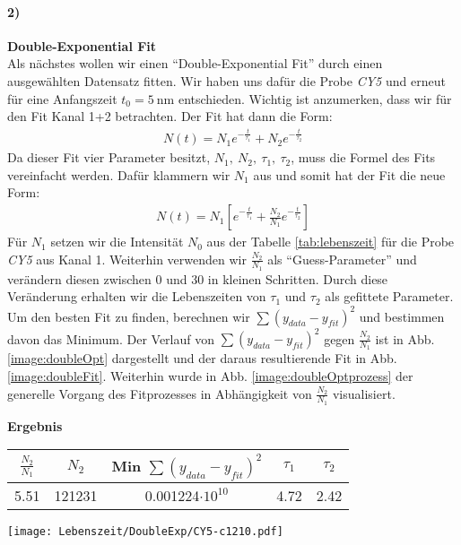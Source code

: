 \paragraph{2)}\textbf{Double-Exponential Fit}\\
Als nächstes wollen wir einen \enquote{Double-Exponential Fit} durch einen ausgewählten Datensatz fitten. Wir haben uns dafür die Probe \textit{CY5} und erneut für eine Anfangszeit $t_{0}=\SI{5}{\nano\metre}$ entschieden. Wichtig ist anzumerken, dass wir für den Fit Kanal 1+2 betrachten. Der Fit hat dann die Form:
\begin{gather}
    N(t) = N_1e^{-\frac{t}{\tau_1}} + N_2e^{-\frac{t}{\tau_2}}
\end{gather}
Da dieser Fit vier Parameter besitzt, $N_1,~N_2,~\tau_1,~\tau_2$, muss die Formel des Fits vereinfacht werden. Dafür klammern wir $N_1$ aus und somit hat der Fit die neue Form:
\begin{gather}
    N(t) = N_1\left[e^{-\frac{t}{\tau_1}} + \frac{N_2}{N_1}e^{-\frac{t}{\tau_2}}\right]
\end{gather}
Für $N_1$ setzen wir die Intensität $N_0$ aus der Tabelle \ref{tab:lebenszeit} für die Probe \textit{CY5} aus Kanal 1. Weiterhin verwenden wir $\frac{N_2}{N_1}$ als \enquote{Guess-Parameter} und verändern diesen zwischen 0 und 30 in kleinen Schritten. Durch diese Veränderung erhalten wir die Lebenszeiten von $\tau_1$ und $\tau_2$ als gefittete Parameter. Um den besten Fit zu finden, berechnen wir $\sum(y_{data}-y_{fit})^2$ und bestimmen davon das Minimum. Der Verlauf von $\sum(y_{data}-y_{fit})^2$ gegen $\frac{N_2}{N_1}$ ist in Abb. \ref{image:doubleOpt} dargestellt und der daraus resultierende Fit in Abb. \ref{image:doubleFit}. Weiterhin wurde in Abb. \ref{image:doubleOptprozess} der generelle Vorgang des Fitprozesses in Abhängigkeit von $\frac{N_2}{N_1}$ visualisiert.
\begin{center}
    \textbf{Ergebnis}\\[0,2cm]
    \begin{tabular}{c c | c c c}
        $\frac{N_2}{N_1}$ & $N_2$ & Min $\sum(y_{data}-y_{fit})^2$ & $\tau_1$ & $\tau_2$ \\
        \hline
        5.51 & 121231 & 0.001224$\cdot10^{10}$ & 4.72 & 2.42 \\
    \end{tabular}
\end{center}
\begin{center}
    \texttt{[image: Lebenszeit/DoubleExp/CY5-c1210.pdf]}
    \label{image:doubleFit}
\end{center}
